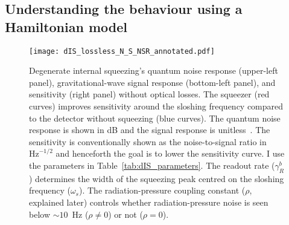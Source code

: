 \begin{comment}
	Inspecting $\text{T}\begin{bsmallmatrix}1 \\1\end{bsmallmatrix}$, i.e.\ the vector of signal transfer functions to each quadrature, shows that there are two terms: (1) rotates between the quadratures with the pump phase and (2) stays in the second quadrature and never vanishes with the pump phase\jam{(is it worth showing this?)}. I consider measuring the second quadrature at the photodetector since the signal is always there~\footnote{This does not mean that it is necessarily optimal to do so since the profile of the noise between the two quadratures is different to the signal, but it will suffice here~\cite{}.\jam{(What happens if I use $\phi=\pi$ and observe the first quadrature instead?)}}, and therefore the sensitivity ($\sqrt{S_h}$ is the noise-to-signal ratio) is
	\begin{equation}
	S_h = \frac{(\text{S}_X)_{2,2}}{\abs{(\text{T}\begin{bsmallmatrix}1 \\1\end{bsmallmatrix})_2}^2}.
	\end{equation}
\end{comment}


\subsection{Understanding the behaviour using a Hamiltonian model}
\label{sec:dIS_results}

\begin{figure}
	\centering
	\texttt{[image: dIS\_lossless\_N\_S\_NSR\_annotated.pdf]}
	\caption{ Degenerate internal squeezing's quantum noise response (upper-left panel), gravitational-wave signal response (bottom-left panel), and sensitivity (right panel) without optical losses. The squeezer (red curves) improves sensitivity around the sloshing frequency compared to the detector without squeezing (blue curves). The quantum noise response is shown in dB and the signal response is unitless~\cite{danilishinQuantumMeasurementTheory2012}. The sensitivity is conventionally shown as the noise-to-signal ratio in $\text{Hz}^{-1/2}$ and henceforth the goal is to lower the sensitivity curve. I use the parameters in Table~\ref{tab:dIS_parameters}. The readout rate ($\gamma^b_R$) determines the width of the squeezing peak centred on the sloshing frequency ($\omega_s$). %
	The radiation-pressure coupling constant ($\rho$, explained later) controls whether radiation-pressure noise is seen below $\sim10$~Hz ($\rho\neq0$) or not ($\rho=0$).
	}
	\label{fig:dIS_sensitivity}
\end{figure}

